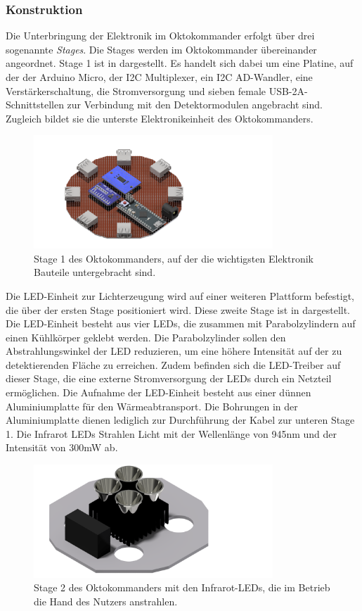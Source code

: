 \subsubsection*{Konstruktion}
Die Unterbringung der Elektronik im Oktokommander erfolgt über drei sogenannte \textit{Stages}. Die Stages werden im Oktokommander übereinander angeordnet. Stage 1 ist in  dargestellt. Es handelt sich dabei um eine Platine, auf der der Arduino Micro, der I2C Multiplexer, ein I2C AD-Wandler, eine Verstärkerschaltung, die Stromversorgung und sieben female USB-2A-Schnittstellen zur Verbindung mit den Detektormodulen angebracht sind. Zugleich bildet sie die unterste Elektronikeinheit des Oktokommanders.
\begin{figure}[H]
	\centering
	\includegraphics[width=9cm]{../CAD_Bilder/OktagonElektronik_Stage1_raytraced.png}
	\caption{Stage 1 des Oktokommanders, auf der die wichtigsten Elektronik Bauteile untergebracht sind.}
	\label{fig:OktoStage1}
\end{figure}
\noindent
Die LED-Einheit zur Lichterzeugung wird auf einer weiteren Plattform befestigt, die über der ersten Stage positioniert wird. Diese zweite Stage ist in  dargestellt. Die LED-Einheit besteht aus vier LEDs, die zusammen mit Parabolzylindern auf einen Kühlkörper geklebt werden. Die Parabolzylinder sollen den Abstrahlungswinkel der LED reduzieren, um eine höhere Intensität auf der zu detektierenden Fläche zu erreichen. Zudem befinden sich die LED-Treiber auf dieser Stage, die eine externe Stromversorgung der LEDs durch ein Netzteil ermöglichen. Die Aufnahme der LED-Einheit besteht aus einer dünnen Aluminiumplatte für den Wärmeabtransport. Die Bohrungen in der Aluminiumplatte dienen lediglich zur Durchführung der Kabel zur unteren Stage 1. Die Infrarot LEDs Strahlen Licht mit der Wellenlänge von 945nm und der Intensität von 300mW ab. 
\begin{figure}[H]
	\centering
	\includegraphics[width=9cm]{../CAD_Bilder/OktagonElektronik_Stage2_raytraced.png}
	\caption{Stage 2 des Oktokommanders mit den Infrarot-LEDs, die im Betrieb die Hand des Nutzers anstrahlen.}
	\label{fig:OktoStage2}
\end{figure}
